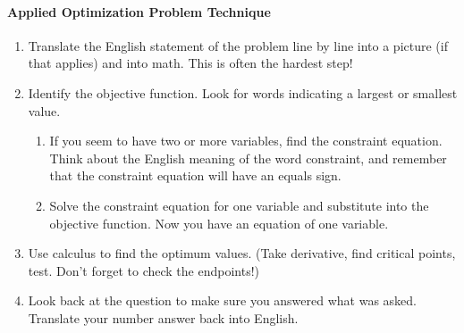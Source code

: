 \paragraph*{Applied Optimization Problem Technique}
  \begin{enumerate}
      \item Translate the English statement of the problem line by line into a picture (if that applies) and into math. This is often the hardest step!
      \item Identify the objective function. Look for words indicating a largest or smallest value.
      \begin{enumerate}[label=(\alph*)]
        \item If you seem to have two or more variables, find the constraint equation. Think about the English meaning of the word constraint, and remember that the constraint equation will have an equals sign.
        \item Solve the constraint equation for one variable and substitute into the objective function. Now you have an equation of one variable.
      \end{enumerate}
      \item Use calculus to find the optimum values. (Take derivative, find critical points, test. Don't forget to check the endpoints!)
      \item Look back at the question to make sure you answered what was asked. Translate your number answer back into English.
    \end{enumerate}

